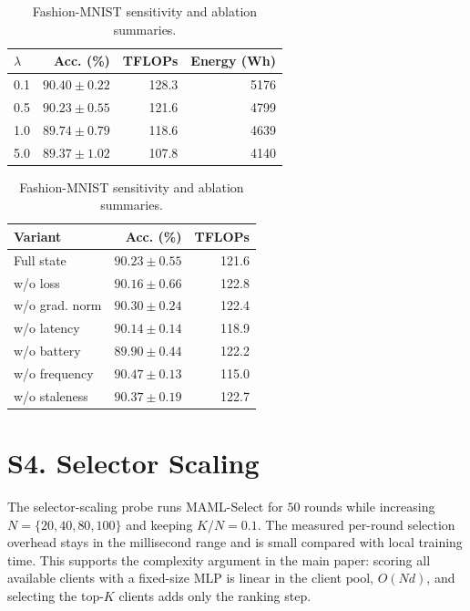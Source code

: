 \documentclass[10pt]{article}
\begin{document}
\begin{table}[!ht]
\centering
\caption{Fashion-MNIST sensitivity and ablation summaries.}
\label{tab:supp_design}
\footnotesize
\begin{minipage}{0.48\textwidth}
\centering
\begin{tabular}{@{}lrrr@{}}
\toprule
$\lambda$ & Acc. (\%) & TFLOPs & Energy (Wh) \\
\midrule
0.1 & $90.40 \pm 0.22$ & 128.3 & 5176 \\
0.5 & $90.23 \pm 0.55$ & 121.6 & 4799 \\
1.0 & $89.74 \pm 0.79$ & 118.6 & 4639 \\
5.0 & $89.37 \pm 1.02$ & 107.8 & 4140 \\
\bottomrule
\end{tabular}
\end{minipage}
\hfill
\begin{minipage}{0.48\textwidth}
\centering
\begin{tabular}{@{}lrr@{}}
\toprule
Variant & Acc. (\%) & TFLOPs \\
\midrule
Full state & $90.23 \pm 0.55$ & 121.6 \\
w/o loss & $90.16 \pm 0.66$ & 122.8 \\
w/o grad. norm & $90.30 \pm 0.24$ & 122.4 \\
w/o latency & $90.14 \pm 0.14$ & 118.9 \\
w/o battery & $89.90 \pm 0.44$ & 122.2 \\
w/o frequency & $90.47 \pm 0.13$ & 115.0 \\
w/o staleness & $90.37 \pm 0.19$ & 122.7 \\
\bottomrule
\end{tabular}
\end{minipage}
\end{table}

\section*{S4. Selector Scaling}

The selector-scaling probe runs MAML-Select for $50$ rounds while increasing $N=\{20,40,80,100\}$ and keeping $K/N=0.1$.  The measured per-round selection overhead stays in the millisecond range and is small compared with local training time.  This supports the complexity argument in the main paper: scoring all available clients with a fixed-size MLP is linear in the client pool, $O(Nd)$, and selecting the top-$K$ clients adds only the ranking step.
\end{document}
